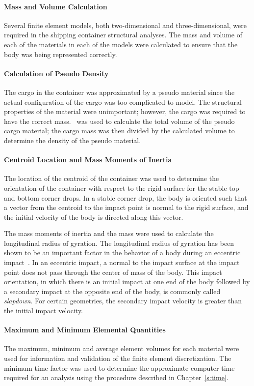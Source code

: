 \paragraph*{Mass and Volume Calculation} Several finite element
models, both two-dimensional and three-dimensional, were required in
the shipping container structural analyses.  The mass and volume of
each of the materials in each of the models were calculated to ensure
that the body was being represented correctly. 

\paragraph*{Calculation of Pseudo Density} The cargo in the container
was approximated by a pseudo material since the actual configuration
of the cargo was too complicated to model.  The structural properties
of the material were unimportant; however, the cargo was required to
have the correct mass.  \NUM\ was used to calculate the total volume
of the pseudo cargo material; the cargo mass was then divided by the
calculated volume to determine the density of the pseudo material. 

\paragraph*{Centroid Location and Mass Moments of Inertia} The
location of the centroid of the container was  used to
determine the orientation of the container with respect to the rigid
surface for the stable top and bottom corner drops.  In a stable
corner drop, the body is oriented such that a vector from the centroid
to the impact point is normal to the rigid surface, and the
initial velocity of the body is directed along this vector.  

The mass moments of inertia and the mass were used to calculate the
longitudinal radius of gyration.  The longitudinal radius of gyration
has been shown to be an important factor in the behavior of a body
during an eccentric impact~\cite{slapdown}. In an eccentric impact, a
normal to the impact surface at the impact point does not pass through
the center of mass of the body.  This impact orientation, in which
there is an initial impact at one end of the body followed by a
secondary impact at the opposite end of the body, is commonly called
{\em slapdown}.  For certain geometries, the secondary impact velocity
is greater than the initial impact velocity. 

\paragraph*{Maximum and Minimum Elemental Quantities} The maximum,
minimum and average element volumes for each material were used for
information and validation of the finite element discretization.  The
minimum time factor was used to determine the approximate computer
time required for an analysis using the procedure described in
Chapter~\ref{s:time}. 


